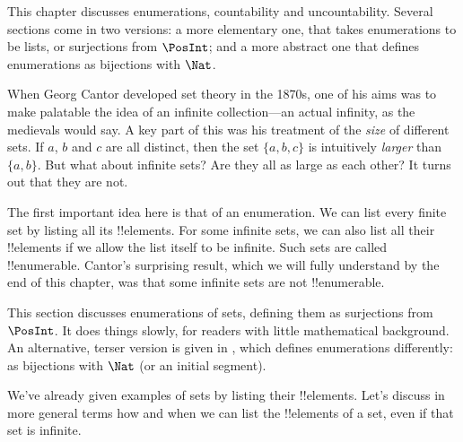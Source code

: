 


\begin{editorial}
This chapter discusses enumerations, countability and uncountability.
Several sections come in two versions: a more elementary one, that
takes enumerations to be lists, or surjections from $\PosInt$; and a
more abstract one that defines enumerations as bijections with $\Nat$.
\end{editorial}





When Georg Cantor developed set theory in the 1870s, one of his aims
was to make palatable the idea of an infinite collection---an actual
infinity, as the medievals would say.  A key part of this was his
treatment of the \emph{size} of different sets. If $a$, $b$ and $c$ are
all distinct, then the set $\{a, b, c\}$ is intuitively \emph{larger}
than $\{a, b\}$. But what about infinite sets? Are they all as large
as each other? It turns out that they are not.

The first important idea here is that of an enumeration.  We can
list every finite set by listing all its !!{element}s.  For some
infinite sets, we can also list all their !!{element}s if we allow the
list itself to be infinite. Such sets are called !!{enumerable}.
Cantor's surprising result, which we will fully understand by the end
of this chapter, was that some infinite sets are not !!{enumerable}.







\begin{editorial}
  This section discusses enumerations of sets, defining them as
  surjections from $\PosInt$. It does things slowly, for readers with
  little mathematical background. An alternative, terser
  version is given in , which defines enumerations
  differently: as bijections with $\Nat$ (or an initial segment).
\end{editorial}

\begin{explain}
We've already given examples of sets by listing their !!{element}s.
Let's discuss in more general terms how and when we can list the
!!{element}s of a set, even if that set is infinite.
\end{explain}

